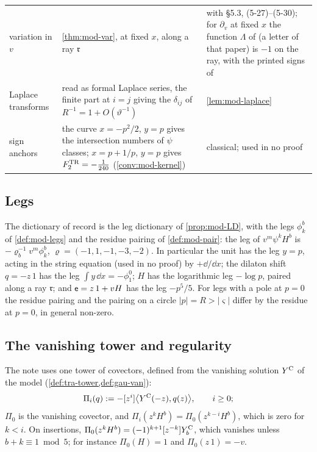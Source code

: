 \begin{table}[ht]
\begin{tabular}{@{}>{\raggedright\arraybackslash}p{}>{\raggedright\arraybackslash}p{}>{\raggedright\arraybackslash}p{}@{}}
variation in $v$ & \cref{thm:mod-var}, at fixed $x$, along a ray $\mathfrak r$ & \cite[Theorem~5.1, (5-14)--(5-15)]{Eynard:2007kz} with \S5.3, (5-27)--(5-30); for $\partial_v$ at fixed $x$ the function $\Lambda$ of \cite[(5-13)]{Eynard:2007kz} (a letter of that paper) is $-1$ on the ray, with the printed signs of \cite[(5-1), (5-13)]{Eynard:2007kz} \\
Laplace transforms & \cite[(2-31), (2-32)]{Dunin-Barkowski:2015caa} read as formal Laplace series, the finite part at $i=j$ giving the $\delta_{ij}$ of $R^{-1}=1+O(\vartheta^{-1})$ & \cref{lem:mod-laplace} \\
sign anchors & the curve $x=-p^2/2$, $y=p$ gives the intersection numbers of $\psi$ classes; $x=p+1/p$, $y=p$ gives $F^{\mathrm{TR}}_2=-\frac1{240}$ (\cref{conv:mod-kernel}) & classical; used in no proof \\
\hline
\end{tabular}
\end{table}

\subsection{Legs}
\label{sec:sgn-legs}

The dictionary of record is the leg dictionary of \cref{prop:mod-LD}, with the legs $\phi^b_k$ of \cref{def:mod-legs} and the residue pairing of \cref{def:mod-pair}: the leg of $v^m\psi^kH^b$ is $-\varrho_b^{-1}v^m\phi^b_k$, $\varrho=(-1,1,-1,-3,-2)$. In particular the unit has the leg $y=p$, acting in the string equation (used in no proof) by $+\dd/\dd x$; the dilaton shift $q=-z\,1$ has the leg $\int y\,\dd x=-\phi^0_1$; $H$ has the logarithmic leg $-\log p$, paired along a ray $\mathfrak r$; and $\mathsf{e}=z\,1+vH$ has the leg $-p^5/5$. For legs with a pole at $p=0$ the residue pairing and the pairing on a circle $|p|=R>|\varsigma|$ differ by the residue at $p=0$, in general non-zero.

\subsection{The vanishing tower and regularity}
\label{sec:sgn-tower}

The note uses one tower of covectors, defined from the vanishing solution $Y^{\mathrm{C}}$ of the model (\cref{def:tra-tower,def:gau-van}):
\[
\Pi_i(q):=-[z^i]\bigl\langle Y^{\mathrm{C}}(-z),q(z)\bigr\rangle,\qquad i\geq0;
\]
$\Pi_0$ is the vanishing covector, and $\Pi_i(z^kH^b)=\Pi_0(z^{k-i}H^b)$, which is zero for $k<i$. On insertions, $\Pi_0(z^kH^b)=(-1)^{k+1}[z^{-k}]Y^{\mathrm{C}}_b$, which vanishes unless $b+k\equiv1\bmod5$; for instance $\Pi_0(H)=1$ and $\Pi_0(z\,1)=-v$.

